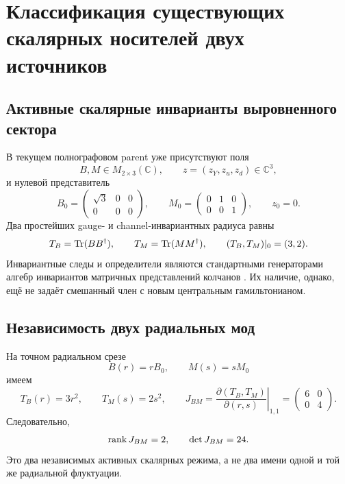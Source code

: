 \chapter{Классификация существующих скалярных носителей двух источников}
\label{ch:v8-extra-mass-two-source-scalar-carriers}

\section{Активные скалярные инварианты выровненного сектора}

В текущем полнографовом parent уже присутствуют поля
\begin{equation}
 B,M\in M_{2\times3}(\mathbb C),\qquad
 z=(z_Y,z_u,z_d)\in\mathbb C^3,
 \label{eq:v8-two-source-carriers-fields}
\end{equation}
и нулевой представитель
\begin{equation}
 B_0=\begin{pmatrix}\sqrt3&0&0\\0&0&0\end{pmatrix},
 \qquad
 M_0=\begin{pmatrix}0&1&0\\0&0&1\end{pmatrix},
 \qquad z_0=0.
 \label{eq:v8-two-source-carriers-vacuum}
\end{equation}
Два простейших gauge- и channel-инвариантных радиуса равны
\begin{equation}
 T_B=\operatorname{Tr}(BB^\dagger),\qquad T_M=\operatorname{Tr}(MM^\dagger),
 \qquad (T_B,T_M)|_0=(3,2).
 \label{eq:v8-two-source-carriers-radii}
\end{equation}
Инвариантные следы и определители являются стандартными генераторами
алгебр инвариантов матричных представлений колчанов
\cite{v8-two-source-carriers-lopatin}. Их наличие, однако, ещё не задаёт
смешанный член с новым центральным гамильтонианом.

\section{Независимость двух радиальных мод}

На точном радиальном срезе
\begin{equation}
 B(r)=rB_0,\qquad M(s)=sM_0
 \label{eq:v8-two-source-carriers-radial-slice}
\end{equation}
имеем
\begin{equation}
 T_B(r)=3r^2,\qquad T_M(s)=2s^2,
 \qquad
 J_{BM}=\left.\frac{\partial(T_B,T_M)}{\partial(r,s)}\right|_{1,1}
 =\begin{pmatrix}6&0\\0&4\end{pmatrix}.
 \label{eq:v8-two-source-carriers-jacobian}
\end{equation}
Следовательно,
\begin{equation}
 \operatorname{rank} J_{BM}=2,\qquad \det J_{BM}=24.
 \label{eq:v8-two-source-carriers-rank}
\end{equation}
Это два независимых активных скалярных режима, а не два имени одной и той
же радиальной флуктуации.

